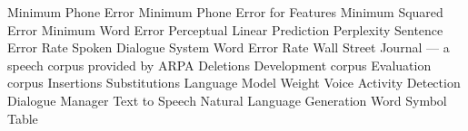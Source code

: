 \begin{acronym}[TDMA]
     {Minimum Phone Error}
     {Minimum Phone Error for Features}
     {Minimum Squared Error}
     {Minimum Word Error}
     {Perceptual Linear Prediction}
     {Perplexity}
     {Sentence Error Rate}
     {Spoken Dialogue System}
     {Word Error Rate}
     {Wall Street Journal --- a speech corpus provided by ARPA}
     {Deletions}
     {Development corpus}
     {Evaluation corpus}
     {Insertions}
     {Substitutions}
     {Language Model Weight}
     {Voice Activity Detection}
     {Dialogue Manager}
     {Text to Speech}
     {Natural Language Generation}
     {Word Symbol Table}
\end{acronym}

